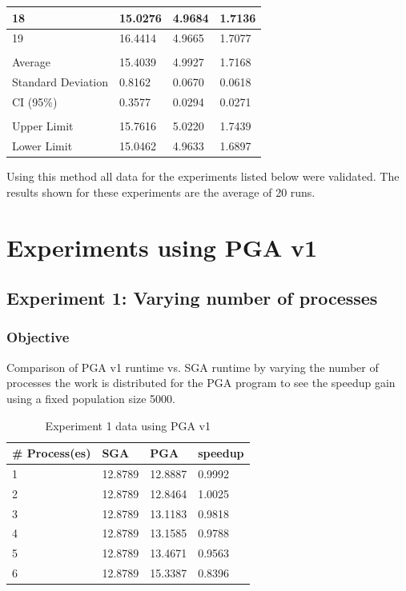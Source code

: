 \begin{table}[!htb]
\begin{tabular}{|l|l|l|l|}
18                 & 15.0276 & 4.9684 & 1.7136 \\ \hline
19                 & 16.4414 & 4.9665 & 1.7077 \\ \hline
\multicolumn{4}{|l|}{}                         \\ \hline
Average            & 15.4039 & 4.9927 & 1.7168 \\ \hline
Standard Deviation & 0.8162  & 0.0670 & 0.0618 \\ \hline
CI (95\%)          & 0.3577  & 0.0294 & 0.0271 \\ \hline
\multicolumn{4}{|l|}{}                         \\ \hline
Upper Limit        & 15.7616 & 5.0220 & 1.7439 \\ \hline
Lower Limit        & 15.0462 & 4.9633 & 1.6897 \\ \hline
\end{tabular}
\end{table}


Using this method all data for the experiments listed below were validated. The results shown for these experiments are the average of 20 runs.

\section{Experiments using PGA v1}

\subsection{Experiment 1: Varying number of processes}

\subsubsection{Objective}
Comparison of PGA v1 runtime vs. SGA runtime by varying the number of processes the work is distributed for the PGA program to see the speedup gain using a fixed population size 5000.

\begin{table}[H]
\centering
\caption{Experiment 1 data using PGA v1}
\label{tab:pga1_node}
\begin{tabular}{|l|l|l|l|}
\hline
\# Process(es) & SGA     & PGA     & speedup \\ \hline
1        & 12.8789 & 12.8887 & 0.9992  \\ \hline
2        & 12.8789 & 12.8464 & 1.0025  \\ \hline
3        & 12.8789 & 13.1183 & 0.9818  \\ \hline
4        & 12.8789 & 13.1585 & 0.9788  \\ \hline
5        & 12.8789 & 13.4671 & 0.9563  \\ \hline
6        & 12.8789 & 15.3387 & 0.8396  \\ \hline
\end{tabular}
\end{table}

